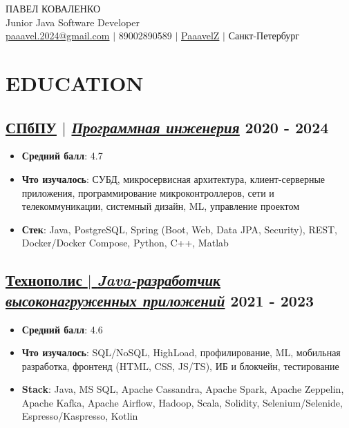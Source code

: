 \documentclass[11pt]{article}
\begin{document}
\begin{center}
    {\fontsize{36}{36}\selectfont\interthin ПАВЕЛ \interheavy КОВАЛЕНКО} \\ \bigskip
    {\fontsize{25}{25}\selectfont\interthin Junior Java Software Developer} \\ \bigskip
    {\color{icnclr}\faEnvelope[regular]} \href{mailto:paaavel.2024@gmail.com}{paaavel.2024@gmail.com} $|$ 
    {\color{icnclr}} 89002890589 $|$
    {\color{icnclr}\faGithub} \href{https://github.com/PaaavelZ}{PaaavelZ} $|$
    {\color{icnclr}\faMapMarker} Санкт-Петербург
\end{center}

\section{EDUCATION}
\subsection{\href{https://www.spbstu.ru/}{\underline{СПбПУ}} $|$ {\normalfont\textit{\href{https://www.spbstu.ru/structure/graduate_school_software_engineering/}{\underline{Программная инженерия}}}} \hfill 2020 - 2024}
\begin{itemize}
    \item \textbf{Средний балл}: 4.7
    \item \textbf{Что изучалось}: СУБД, микросервисная архитектура, клиент-серверные приложения, программирование микроконтроллеров, сети и телекоммуникации, системный дизайн, ML, управление проектом
    \item \textbf{Стек}: Java, PostgreSQL, Spring (Boot, Web, Data JPA, Security), REST, Docker/Docker Compose, Python, C++, Matlab
\end{itemize}

\subsection{\href{https://polis.vk.company/}{\underline{Технополис} $|$ {\normalfont\textit{\underline{Java-разработчик высоконагруженных приложений}}}} \hfill 2021 - 2023}
\begin{itemize}
    \item \textbf{Средний балл}: 4.6
    \item \textbf{Что изучалось}: SQL/NoSQL, HighLoad, профилирование, ML, мобильная разработка, фронтенд (HTML, CSS, JS/TS), ИБ и блокчейн, тестирование
    \item \textbf{Stack}: Java, MS SQL, Apache Cassandra, Apache Spark, Apache Zeppelin, Apache Kafka, Apache Airflow, Hadoop, Scala, Solidity, Selenium/Selenide, Espresso/Kaspresso, Kotlin
\end{itemize}
\end{document}
